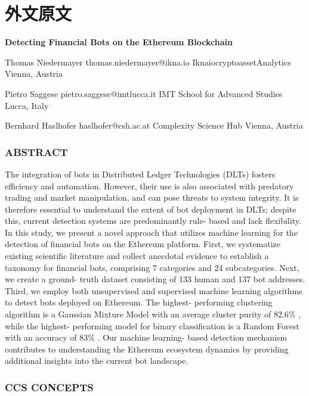 \cleardoublepage
\chapter{外文原文}

\begin{center}
{\Large\bfseries Detecting Financial Bots on the Ethereum Blockchain}
\end{center}

Thomas Niedermayer \quad thomas.niedermayer@ikna.io \quad IknaiocryptoassetAnalytics \quad Vienna, Austria

Pietro Saggese \quad pietro.saggese@imtlucca.it \quad IMT School for Advanced Studies \quad Lucca, Italy

Bernhard Haslhofer \quad haslhofer@csh.ac.at \quad Complexity Science Hub \quad Vienna, Austria

\subsection*{ABSTRACT}

The integration of bots in Distributed Ledger Technologies (DLTs) fosters efficiency and automation. However, their use is also associated with predatory trading and market manipulation, and can pose threats to system integrity. It is therefore essential to understand the extent of bot deployment in DLTs; despite this, current detection systems are predominantly rule- based and lack flexibility. In this study, we present a novel approach that utilizes machine learning for the detection of financial bots on the Ethereum platform. First, we systematize existing scientific literature and collect anecdotal evidence to establish a taxonomy for financial bots, comprising 7 categories and 24 subcategories. Next, we create a ground- truth dataset consisting of 133 human and 137 bot addresses. Third, we employ both unsupervised and supervised machine learning algorithms to detect bots deployed on Ethereum. The highest- performing clustering algorithm is a Gaussian Mixture Model with an average cluster purity of \(82.6\%\) , while the highest- performing model for binary classification is a Random Forest with an accuracy of \(83\%\) . Our machine learning- based detection mechanism contributes to understanding the Ethereum ecosystem dynamics by providing additional insights into the current bot landscape.

\subsection*{CCS CONCEPTS}


